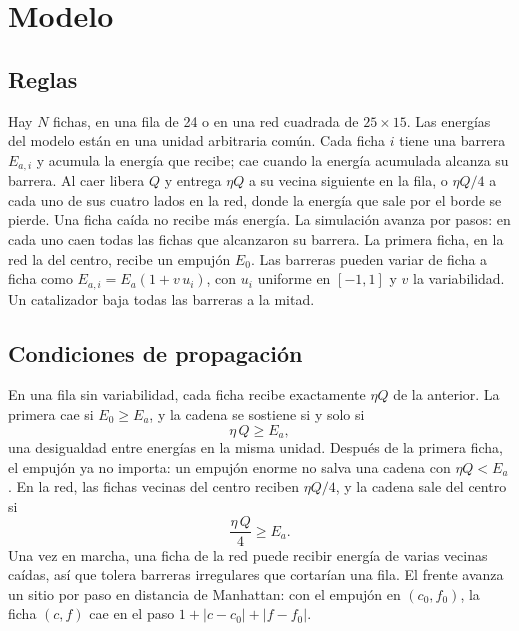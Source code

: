 \documentclass[11pt,a4paper]{article}
\begin{document}
\section{Modelo}\label{sec:modelo}

\subsection{Reglas}

Hay $N$ fichas, en una fila de 24 o en una red cuadrada de $25 \times 15$. Las energías del modelo están en una unidad arbitraria común. Cada ficha $i$ tiene una barrera $E_{a,i}$ y acumula la energía que recibe; cae cuando la energía acumulada alcanza su barrera. Al caer libera $Q$ y entrega $\eta Q$ a su vecina siguiente en la fila, o $\eta Q/4$ a cada uno de sus cuatro lados en la red, donde la energía que sale por el borde se pierde. Una ficha caída no recibe más energía. La simulación avanza por pasos: en cada uno caen todas las fichas que alcanzaron su barrera. La primera ficha, en la red la del centro, recibe un empujón $E_0$. Las barreras pueden variar de ficha a ficha como $E_{a,i} = E_a(1 + v\,u_i)$, con $u_i$ uniforme en $[-1, 1]$ y $v$ la variabilidad. Un catalizador baja todas las barreras a la mitad.

\subsection{Condiciones de propagación}

En una fila sin variabilidad, cada ficha recibe exactamente $\eta Q$ de la anterior. La primera cae si $E_0 \ge E_a$, y la cadena se sostiene si y solo si
\begin{equation}\label{eq:fila}
\eta\, Q \ge E_a ,
\end{equation}
una desigualdad entre energías en la misma unidad. Después de la primera ficha, el empujón ya no importa: un empujón enorme no salva una cadena con $\eta Q < E_a$. En la red, las fichas vecinas del centro reciben $\eta Q/4$, y la cadena sale del centro si
\begin{equation}\label{eq:red}
\frac{\eta\, Q}{4} \ge E_a .
\end{equation}
Una vez en marcha, una ficha de la red puede recibir energía de varias vecinas caídas, así que tolera barreras irregulares que cortarían una fila. El frente avanza un sitio por paso en distancia de Manhattan: con el empujón en $(c_0, f_0)$, la ficha $(c, f)$ cae en el paso $1 + |c - c_0| + |f - f_0|$.
\end{document}
